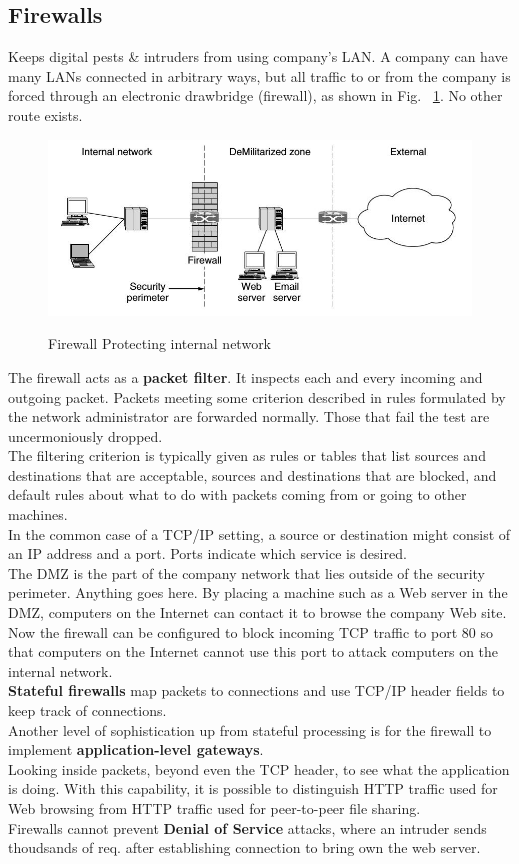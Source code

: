 \documentclass[a4paper,oneside]{book}
\begin{document}
\subsection{Firewalls}
Keeps digital pests \& intruders from using company's LAN. A company can have many LANs connected in arbitrary ways, but all traffic to or from the company is forced through an electronic drawbridge (firewall), as shown in Fig. ~\ref{fig:firewall}. No other route exists.
\begin{figure}[H]
\caption{Firewall Protecting internal network}
\includegraphics[scale=0.7]{Images/firewall}
\label{fig:firewall}
\end{figure}
The firewall acts as a \textbf{packet filter}. It inspects each and every incoming and outgoing packet. Packets meeting some criterion described in rules formulated by the network administrator are forwarded normally. Those that fail the test are uncermoniously dropped.\\
The filtering criterion is typically given as rules or tables that list sources and destinations that are acceptable, sources and destinations that are blocked, and default rules about what to do with packets coming from or going to other machines.\\
In the common case of a TCP/IP setting, a source or destination might consist of an IP address and a port. Ports indicate which service is desired. \\
The DMZ is the part of the company network that lies outside of the security perimeter. Anything goes here. By placing a machine such as a Web server in the DMZ, computers on the Internet can contact it to browse the company Web site. Now the firewall can be configured to block incoming TCP traffic to port 80 so that computers on the Internet cannot use this port to attack computers on the internal network.\\
 \textbf{Stateful firewalls} map packets to connections and  use TCP/IP header fields to keep track of connections. \\
Another level of sophistication up from stateful processing is for the firewall to implement \textbf{application-level gateways}.\\
Looking inside packets, beyond even the TCP header, to see what the application is doing. With this capability, it is possible to distinguish HTTP traffic used for Web browsing from HTTP traffic used for peer-to-peer file sharing. \\
Firewalls cannot prevent \textbf{Denial of Service} attacks, where an intruder sends thoudsands of req. after establishing connection to bring own the web server.
\end{document}
